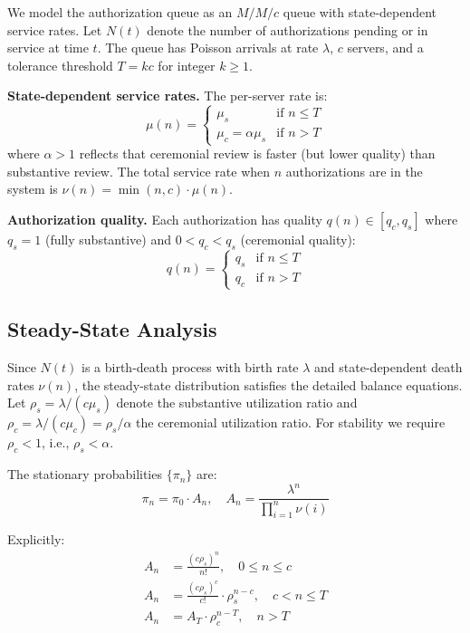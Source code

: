 \documentclass[runningheads]{llncs}
\begin{document}
We model the authorization queue as an $M/M/c$ queue with state-dependent service rates.
Let $N(t)$ denote the number of authorizations pending or in service at time $t$.
The queue has Poisson arrivals at rate $\lambda$, $c$ servers, and a tolerance
threshold $T = kc$ for integer $k \geq 1$.

\medskip
\noindent\textbf{State-dependent service rates.} The per-server rate is:
\begin{equation}
\mu(n) = \begin{cases}
\mu_s & \text{if } n \leq T \\
\mu_c = \alpha\mu_s & \text{if } n > T
\end{cases}
\label{eq:service-rate}
\end{equation}
where $\alpha > 1$ reflects that ceremonial review is faster (but lower quality)
than substantive review. The total service rate when $n$ authorizations are in the
system is $\nu(n) = \min(n, c) \cdot \mu(n)$.

\medskip
\noindent\textbf{Authorization quality.} Each authorization has quality
$q(n) \in [q_c, q_s]$ where $q_s = 1$ (fully substantive) and
$0 < q_c < q_s$ (ceremonial quality):
\begin{equation}
q(n) = \begin{cases}
q_s & \text{if } n \leq T \\
q_c & \text{if } n > T
\end{cases}
\label{eq:quality}
\end{equation}

\subsection{Steady-State Analysis}

Since $N(t)$ is a birth-death process with birth rate $\lambda$ and state-dependent
death rates $\nu(n)$, the steady-state distribution satisfies the detailed balance
equations. Let $\rho_s = \lambda/(c\mu_s)$ denote the substantive utilization ratio
and $\rho_c = \lambda/(c\mu_c) = \rho_s/\alpha$ the ceremonial utilization ratio.
For stability we require $\rho_c < 1$, i.e., $\rho_s < \alpha$.

The stationary probabilities $\{\pi_n\}$ are:
\begin{equation}
\pi_n = \pi_0 \cdot A_n, \quad
A_n = \frac{\lambda^n}{\prod_{i=1}^{n} \nu(i)}
\label{eq:stationary}
\end{equation}

Explicitly:
\begin{align}
A_n &= \frac{(c\rho_s)^n}{n!}, \quad 0 \leq n \leq c \label{eq:An-low}\\
A_n &= \frac{(c\rho_s)^c}{c!} \cdot \rho_s^{n-c}, \quad c < n \leq T \label{eq:An-mid}\\
A_n &= A_T \cdot \rho_c^{n-T}, \quad n > T \label{eq:An-high}
\end{align}
\end{document}
